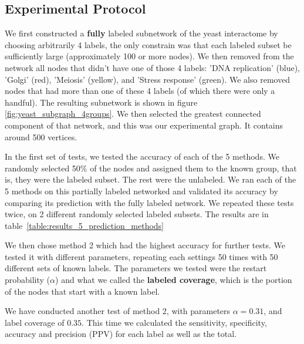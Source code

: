 \subsection*{Experimental Protocol}
We first constructed a \textbf{fully} labeled subnetwork of the
yeast interactome by choosing arbitrarily 4 labels, the only
constrain was that each labeled subset be sufficiently large (approximately
100 or more nodes).
We then removed from the network all nodes that didn't have one of
those 4 labels: 'DNA replication' (blue), 'Golgi' (red), 'Meiosis'
(yellow), and 'Stress response' (green). We also removed nodes that
had more than one of these 4 labels (of which there were only a
handful). The resulting subnetwork is shown in figure
\ref{fig:yeast_subgraph_4groups}. 
We then selected the greatest connected component of that network,
and this was our experimental graph.
It contains around 500 vertices.

In the first set of tests, we tested the accuracy of each of the 5
methods. We randomly selected 50\% of the nodes and
assigned them to the known group, that is, they were the labeled
subset. The rest were the unlabeled. We ran each of the 5 methods on
this partially labeled networked and validated its accuracy by
comparing its prediction with the fully labeled network. We repeated
these tests twice, on 2 different randomly selected labeled subsets.
The results are in table~\ref{table:results_5_prediction_methods}

We then chose method 2 which had the highest accuracy for further
tests. We tested it with different parameters, repeating each
settings 50 times with 50 different sets of known labels. The
parameters we tested were the restart probability ($\alpha$) and
what we called the \textbf{labeled coverage}, which is the portion
of the nodes that start with a known label.

We have conducted another test of method 2, with parameters $\alpha
= 0.31$, and label coverage of $0.35$. This time we calculated the
sensitivity, specificity, accuracy and precision (PPV) for each
label as well as the total.

